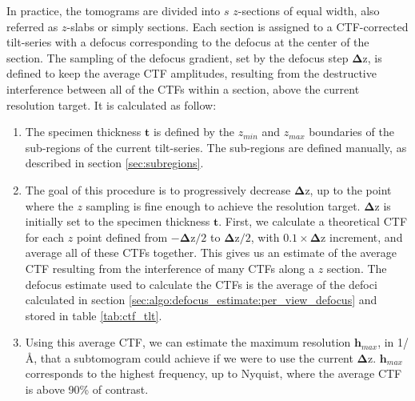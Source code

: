 In practice, the tomograms are divided into $s$ $z$-sections of equal width, also referred as $z$-slabs or simply sections. Each section is assigned to a CTF-corrected tilt-series with a defocus corresponding to the defocus at the center of the section. The sampling of the defocus gradient, set by the defocus step $\bm{\Delta \mathrm{z}}$, is defined to keep the average CTF amplitudes, resulting from the destructive interference between all of the CTFs within a section, above the current resolution target. It is calculated as follow:
\begin{enumerate}
    \item The specimen thickness $\bm{t}$ is defined by the $z_{min}$ and $z_{max}$ boundaries of the sub-regions of the current tilt-series. The sub-regions are defined manually, as described in section \ref{sec:subregions}.
    
    \item The goal of this procedure is to progressively decrease $\bm{\Delta \mathrm{z}}$, up to the point where the $z$ sampling is fine enough to achieve the resolution target. $\bm{\Delta \mathrm{z}}$ is initially set to the specimen thickness $\bm{t}$. First, we calculate a theoretical CTF for each $z$ point defined from $-{\bm{\Delta \mathrm{z}}}/2$ to ${\bm{\Delta \mathrm{z}}}/2$, with $0.1 \times \bm{\Delta \mathrm{z}}$ increment, and average all of these CTFs together. This gives us an estimate of the average CTF resulting from the interference of many CTFs along a $z$ section. The defocus estimate used to calculate the CTFs is the average of the defoci calculated in section \ref{sec:algo:defocus_estimate:per_view_defocus} and stored in table \ref{tab:ctf_tlt}.

    \item Using this average CTF, we can estimate the maximum resolution $\bm{h}_{max}$, in 1/\si{\angstrom}, that a subtomogram could achieve if we were to use the current $\bm{\Delta \mathrm{z}}$. $\bm{h}_{max}$ corresponds to the highest frequency, up to Nyquist, where the average CTF is above 90\% of contrast.


\end{enumerate}
